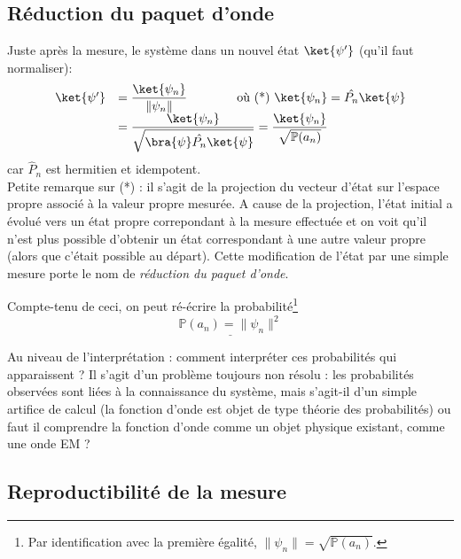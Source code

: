  \subsection{Réduction du paquet d'onde}
 Juste après la mesure, le système dans un nouvel état $\ket{\psi'}$ (qu'il 
 faut normaliser):
 \begin{equation}
 \begin{array}{ll}
 \ket{\psi'} &= \dfrac{\ket{\psi_n}}{\|\psi_n\|}\qquad\qquad \text{où (*) } \ket{\psi_n} 
 = \hat{P_n}\ket{\psi}\\
 &= \dfrac{\ket{\psi_n}}{\sqrt{\bra{\psi}\hat{P_n}\ket{\psi}}} = \dfrac{\ket{\psi_n}}{
 \sqrt{\mathbb{P}(a_n)}}
 \end{array}
 \end{equation}
 car $\hat{P}_n$ est hermitien et idempotent.\\
 Petite remarque sur (*) : il s'agit de la projection du vecteur d'état sur l'espace propre
 associé à la valeur propre mesurée. A cause de la projection, l'état initial a évolué vers un état
 propre correpondant à la mesure effectuée et on voit qu'il n'est plus possible d'obtenir un état
 correspondant à une autre valeur propre (alors que c'était possible au départ). Cette modification
 de l'état par une simple mesure porte le nom de \textit{réduction du paquet d'onde}.
 
 
 Compte-tenu de ceci, on peut ré-écrire la probabilité\footnote{Par identification avec 
 la première égalité, $\|\psi_n\| = \sqrt{\mathbb{P}(a_n)}$.}
 \begin{equation}
 \underline{\mathbb{P}(a_n) = \|\psi_n\|^2}
 \end{equation}
 
 Au niveau de l'interprétation : comment interpréter ces probabilités 
 qui apparaissent ? Il s'agit d'un problème toujours non résolu : les probabilités 
 observées sont liées à la connaissance du système, mais s'agit-il d'un simple artifice
 de calcul (la fonction d'onde est objet de type  théorie des probabilités)
  ou faut il comprendre la fonction d'onde comme un objet 
 physique existant, comme une onde EM ? \\
 
 \subsection{Reproductibilité de la mesure}
  
